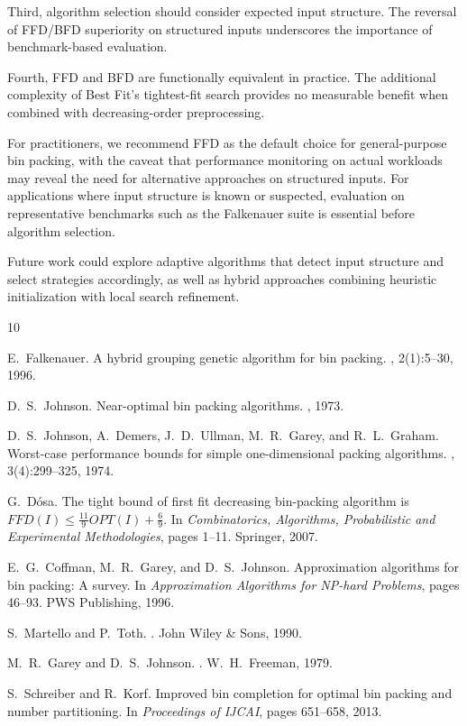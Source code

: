 \documentclass[11pt,a4paper]{article}
\begin{document}
Third, algorithm selection should consider expected input structure. The reversal of FFD/BFD superiority on structured inputs underscores the importance of benchmark-based evaluation.

Fourth, FFD and BFD are functionally equivalent in practice. The additional complexity of Best Fit's tightest-fit search provides no measurable benefit when combined with decreasing-order preprocessing.

For practitioners, we recommend FFD as the default choice for general-purpose bin packing, with the caveat that performance monitoring on actual workloads may reveal the need for alternative approaches on structured inputs. For applications where input structure is known or suspected, evaluation on representative benchmarks such as the Falkenauer suite is essential before algorithm selection.

Future work could explore adaptive algorithms that detect input structure and select strategies accordingly, as well as hybrid approaches combining heuristic initialization with local search refinement.

\begin{thebibliography}{10}

E.~Falkenauer.
\newblock A hybrid grouping genetic algorithm for bin packing.
, 2(1):5--30, 1996.

D.~S.~Johnson.
\newblock Near-optimal bin packing algorithms.
, 1973.

D.~S.~Johnson, A.~Demers, J.~D.~Ullman, M.~R.~Garey, and R.~L.~Graham.
\newblock Worst-case performance bounds for simple one-dimensional packing algorithms.
, 3(4):299--325, 1974.

G.~Dósa.
\newblock The tight bound of first fit decreasing bin-packing algorithm is $FFD(I) \leq \frac{11}{9}OPT(I) + \frac{6}{9}$.
\newblock In {\em Combinatorics, Algorithms, Probabilistic and Experimental Methodologies}, pages 1--11. Springer, 2007.

E.~G.~Coffman, M.~R.~Garey, and D.~S.~Johnson.
\newblock Approximation algorithms for bin packing: A survey.
\newblock In {\em Approximation Algorithms for NP-hard Problems}, pages 46--93. PWS Publishing, 1996.

S.~Martello and P.~Toth.
.
\newblock John Wiley \& Sons, 1990.

M.~R.~Garey and D.~S.~Johnson.
.
\newblock W.~H.~Freeman, 1979.

S.~Schreiber and R.~Korf.
\newblock Improved bin completion for optimal bin packing and number partitioning.
\newblock In {\em Proceedings of IJCAI}, pages 651--658, 2013.

\end{thebibliography}
\end{document}
